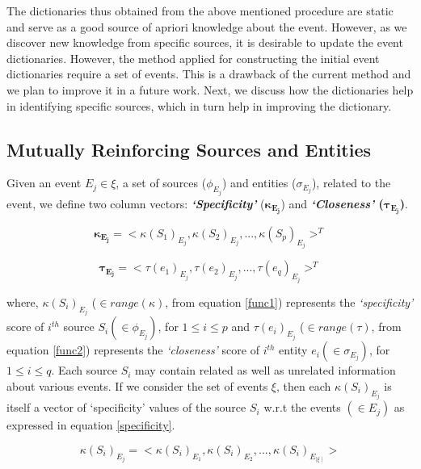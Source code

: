 The dictionaries thus obtained from the above mentioned procedure are static and serve as a good source of apriori knowledge about the event. However, as we discover new knowledge from specific sources, it is desirable to update the event dictionaries. However, the method applied for constructing the initial event dictionaries require a set of events. This is a drawback of the current method and we plan to improve it in a future work. Next, we discuss how the dictionaries help in identifying specific sources, which in turn help in improving the dictionary.

\subsection{\label{mutual}\textbf{Mutually Reinforcing Sources and Entities}}

Given an event $E_{j} \in \xi$, a set of sources ($\phi_{E_{j}}$) and entities ($\sigma_{E_{j}}$), related to the event, we define two column vectors: \textbf{\textit{`Specificity'}} ($\mathbf{\kappa_{E_{j}}}$) and \textbf{\textit{`Closeness'} ($\mathbf{\tau_{E_{j}}}$)}.

\begin{equation}
\mathbf{\kappa_{E_{j}}} = <\kappa(S_{1})_{E_{j}},\kappa(S_{2})_{E_{j}},...,\kappa(S_{p})_{E_{j}} >^{T}
\end{equation}

\begin{equation}
\mathbf{\tau_{E_{j}}} = <\tau(e_{1})_{E_{j}},\tau(e_{2})_{E_{j}},...,\tau(e_{q})_{E_{j}} >^{T}
\end{equation}

\noindent where, $\kappa(S_{i})_{E_{j}}$ ($\in range(\kappa)$, from equation \ref{func1}) represents the \textit{`specificity'} score of $i^{th}$ source $S_{i} (\in \phi_{E_{j}})$, for $1 \le i \le p$ and $\tau(e_{i})_{E_{j}}$ ($\in range(\tau)$, from equation \ref{func2}) represents the \textit{`closeness'} score of $i^{th}$ entity $e_{i} (\in \sigma_{E_{j}})$, for $1 \le i \le q$. Each source $S_{i}$ may contain related as well as unrelated information about various events. If we consider the set of events $\xi$, then each $\kappa(S_{i})_{E_{j}}$ is itself a vector of `specificity' values of the source $S_{i}$ w.r.t the events $(\in E_{j})$ as expressed in equation \ref{specificity}.

\begin{equation}
\label{specificity}
\kappa(S_{i})_{E_{j}} = <\kappa(S_{i})_{E_{1}},\kappa(S_{i})_{E_{2}},...,\kappa(S_{i})_{E_{\mid \xi \mid}}>
\end{equation}

